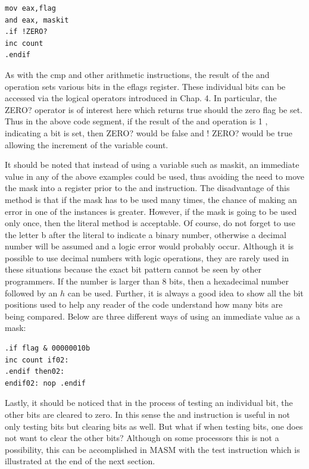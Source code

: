 \documentclass[10pt]{book}
\begin{document}
\begin{verbatim}
mov eax,flag
and eax, maskit
.if !ZERO?
inc count
.endif
\end{verbatim}

As with the cmp and other arithmetic instructions, the result of the and operation sets various bits in the eflags register. These individual bits can be accessed via the logical operators introduced in Chap. 4. In particular, the ZERO? operator is of interest here which returns true should the zero flag be set. Thus in the above code segment, if the result of the and operation is 1 , indicating a bit is set, then ZERO? would be false and ! ZERO? would be true allowing the increment of the variable count.

It should be noted that instead of using a variable such as maskit, an immediate value in any of the above examples could be used, thus avoiding the need to move the mask into a register prior to the and instruction. The disadvantage of this method is that if the mask has to be used many times, the chance of making an error in one of the instances is greater. However, if the mask is going to be used only once, then the literal method is acceptable. Of course, do not forget to use the letter b after the literal to indicate a binary number, otherwise a decimal number will be assumed and a logic error would probably occur. Although it is possible to use decimal numbers with logic operations, they are rarely used in these situations because the exact bit pattern cannot be seen by other programmers. If the number is larger than 8 bits, then a hexadecimal number followed by an $h$ can be used. Further, it is always a good idea to show all the bit positions used to help any reader of the code understand how many bits are being compared. Below are three different ways of using an immediate value as a mask:

\begin{verbatim}
.if flag & 00000010b
inc count if02:
.endif then02:
endif02: nop .endif
\end{verbatim}

Lastly, it should be noticed that in the process of testing an individual bit, the other bits are cleared to zero. In this sense the and instruction is useful in not only testing bits but clearing bits as well. But what if when testing bits, one does not want to clear the other bits? Although on some processors this is not a possibility, this can be accomplished in MASM with the test instruction which is illustrated at the end of the next section.
\end{document}
